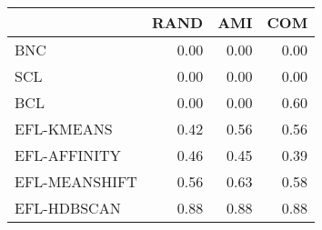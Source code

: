 \begin{tabular}{lrrr}
\toprule
 & RAND & AMI & COM \\
\midrule
BNC & 0.00 & 0.00 & 0.00 \\
SCL & 0.00 & 0.00 & 0.00 \\
BCL & 0.00 & 0.00 & 0.60 \\
EFL-KMEANS & 0.42 & 0.56 & 0.56 \\
EFL-AFFINITY & 0.46 & 0.45 & 0.39 \\
EFL-MEANSHIFT & 0.56 & 0.63 & 0.58 \\
EFL-HDBSCAN & 0.88 & 0.88 & 0.88 \\
\bottomrule
\end{tabular}
